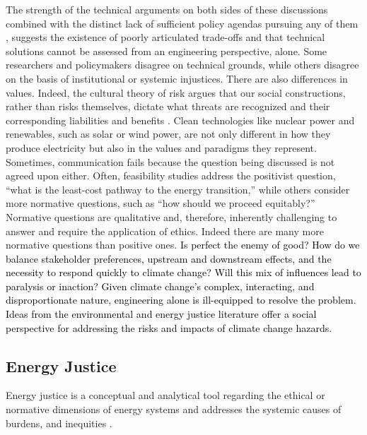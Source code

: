 The strength of the technical arguments on both sides of these discussions
combined with the distinct lack of sufficient policy agendas pursuing any of
them \cite{roelfsema_taking_2020,hale_assessing_2022}, suggests the existence of
poorly articulated trade-offs and that technical solutions cannot be assessed
from an engineering perspective, alone. Some researchers and policymakers
disagree on technical grounds, while others disagree on the basis of
institutional or systemic injustices. There are also differences in values. Indeed, the cultural theory of risk argues that our social constructions, rather than risks themselves, dictate what threats are recognized and their 
corresponding liabilities and benefits \cite{mcneeley_cultural_2014, van_de_graaff_understanding_2016}.
Clean technologies like nuclear power and renewables, such as solar or wind
power, are not only different in how they produce electricity but also in the
values and paradigms they represent. Sometimes, communication fails because the
question being discussed is not agreed upon either. Often, feasibility studies
address the positivist question, ``what is the least-cost pathway to the energy
transition,'' while others consider more normative questions, such as ``how
should we proceed equitably?'' Normative questions are qualitative and,
therefore, inherently challenging to answer and require the application of
ethics. Indeed there are many more normative questions than positive ones.
\textcolor{black}{Is perfect the enemy of good? How do we balance stakeholder
preferences, upstream and downstream effects, and the necessity to respond
quickly to climate change? Will this mix of influences lead to paralysis or
inaction?} \textcolor{black}{Given climate change's complex, interacting, and
disproportionate nature, engineering alone is ill-equipped to resolve the
problem. Ideas from the environmental and energy justice literature offer a
social perspective for addressing the risks and impacts of climate change
hazards.}
\subsection{Energy Justice}



Energy justice is a conceptual and analytical tool regarding the ethical or
normative dimensions of energy systems and addresses the systemic causes of
burdens, and inequities \cite{sovacool_energy_2015}. 

